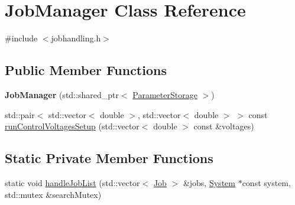 \hypertarget{classJobManager}{}\section{Job\+Manager Class Reference}
\label{classJobManager}


{\ttfamily \#include $<$jobhandling.\+h$>$}

\subsection*{Public Member Functions}
\begin{DoxyCompactItemize}
\item 
\mbox{\label{classJobManager_aa6b79c585bb341aec9f8ad384929c4d7}} 
{\bfseries Job\+Manager} (std\+::shared\+\_\+ptr$<$ \hyperlink{classParameterStorage}{Parameter\+Storage} $>$)
\item 
std\+::pair$<$ std\+::vector$<$ double $>$, std\+::vector$<$ double $>$ $>$ const \hyperlink{classJobManager_af1a851cbf0d447aa2248a2d89b544e9d}{run\+Control\+Voltages\+Setup} (std\+::vector$<$ double $>$ const \&voltages)
\end{DoxyCompactItemize}
\subsection*{Static Private Member Functions}
\begin{DoxyCompactItemize}
\item 
static void \hyperlink{classJobManager_a478365d6287e01484a64105dcd81520e}{handle\+Job\+List} (std\+::vector$<$ \hyperlink{classJob}{Job} $>$ \&jobs, \hyperlink{classSystem}{System} $\ast$const system, std\+::mutex \&search\+Mutex)
\end{DoxyCompactItemize}
